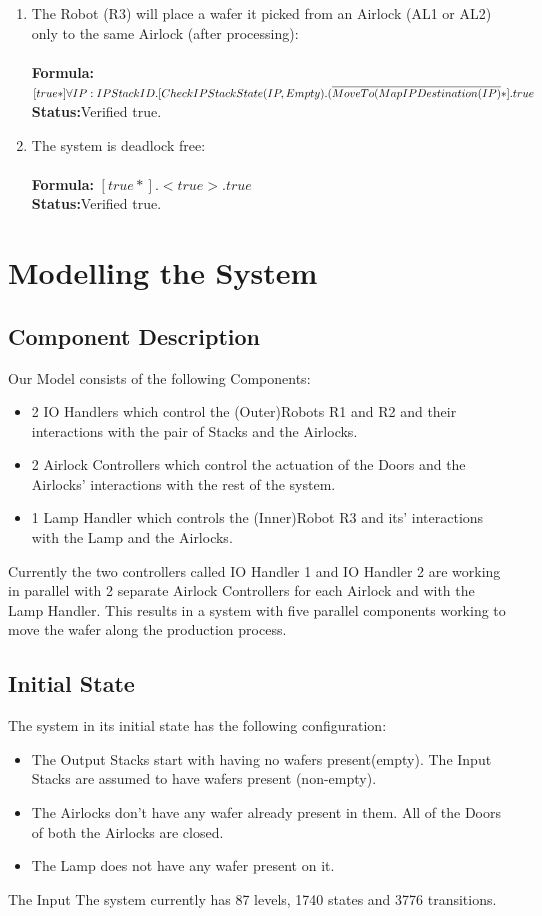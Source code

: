 \documentclass[a4paper,12pt]{article}
\begin{document}
\begin{enumerate}
		\item The Robot (R3) will place a wafer it picked from an Airlock (AL1 or AL2) only to the same Airlock (after processing):
		\\
		\\\textbf{Formula:} $[true*] \forall IP: IPStackID.[CheckIPStackState(IP, Empty).
		\\(\overline{MoveTo(MapIPDestination(IP)}*].true$ \\\textbf{Status:}Verified true.
		
		\item The system is deadlock free:
		\\
		\\\textbf{Formula:} $[true*].<true>.true$
		\\\textbf{Status:}Verified true.
		
	\end{enumerate}
	
	\newpage
	\section{Modelling the System}
	\subsection{Component Description}
	Our Model consists of the following Components:
	\begin{itemize}
		\item 2 IO Handlers which control the (Outer)Robots R1 and R2 and their interactions with the pair of Stacks and the Airlocks.
		\item 2 Airlock Controllers which control the actuation of the Doors and the Airlocks' interactions with the rest of the system.
		\item 1 Lamp Handler which controls the (Inner)Robot R3 and its' interactions with the Lamp and the Airlocks.
	\end{itemize}
	Currently the two controllers called IO Handler 1 and IO Handler 2 are working in parallel with 2 separate Airlock Controllers for each Airlock and with the Lamp Handler. This results in a system with five parallel components working to move the wafer along the production process. 
	\subsection{Initial State}
	The system in its initial state has the following configuration:
	\begin{itemize}
		\item The Output Stacks start with having no wafers present(empty). The Input Stacks are assumed to have wafers present (non-empty).
		\item The Airlocks don't have any wafer already present in them. All of the Doors of both the Airlocks are closed.
		\item The Lamp does not have any wafer present on it.
	\end{itemize} 
	The Input The system currently has 87 levels, 1740 states and 3776 transitions.
\end{document}
